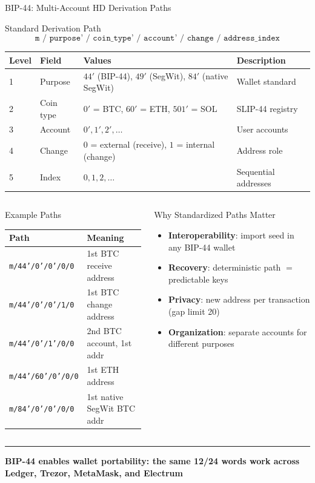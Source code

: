 \documentclass[8pt,aspectratio=169]{beamer}
\newcommand{\bottomnote}[1]{\vfill\vspace{-2mm}\textcolor{mllavender2}{\rule{\textwidth}{0.4pt}}\vspace{1mm}\footnotesize\textbf{#1}}
\begin{document}
\begin{frame}{BIP-44: Multi-Account HD Derivation Paths}
\begin{block}{Standard Derivation Path}
\[
  \texttt{m / purpose' / coin\_type' / account' / change / address\_index}
\]
\end{block}
\vspace{2mm}
\begin{center}
\small
\begin{tabular}{llll}
\toprule
\textbf{Level} & \textbf{Field} & \textbf{Values} & \textbf{Description} \\
\midrule
1 & Purpose & $44'$ (BIP-44), $49'$ (SegWit), $84'$ (native SegWit) & Wallet standard \\
2 & Coin type & $0'$ = BTC, $60'$ = ETH, $501'$ = SOL & SLIP-44 registry \\
3 & Account & $0', 1', 2', \ldots$ & User accounts \\
4 & Change & $0$ = external (receive), $1$ = internal (change) & Address role \\
5 & Index & $0, 1, 2, \ldots$ & Sequential addresses \\
\bottomrule
\end{tabular}
\end{center}
\vspace{3mm}
\begin{columns}
\begin{block}{Example Paths}
\scriptsize
\begin{tabular}{ll}
\toprule
\textbf{Path} & \textbf{Meaning} \\
\midrule
\texttt{m/44'/0'/0'/0/0} & 1st BTC receive address \\
\texttt{m/44'/0'/0'/1/0} & 1st BTC change address \\
\texttt{m/44'/0'/1'/0/0} & 2nd BTC account, 1st addr \\
\texttt{m/44'/60'/0'/0/0} & 1st ETH address \\
\texttt{m/84'/0'/0'/0/0} & 1st native SegWit BTC addr \\
\bottomrule
\end{tabular}
\end{block}
\begin{block}{Why Standardized Paths Matter}
\begin{itemize}\small
  \item \textbf{Interoperability}: import seed in any BIP-44 wallet
  \item \textbf{Recovery}: deterministic path $=$ predictable keys
  \item \textbf{Privacy}: new address per transaction (gap limit 20)
  \item \textbf{Organization}: separate accounts for different purposes
\end{itemize}
\end{block}
\end{columns}
\bottomnote{BIP-44 enables wallet portability: the same 12/24 words work across Ledger, Trezor, MetaMask, and Electrum}
\end{frame}
\end{document}
